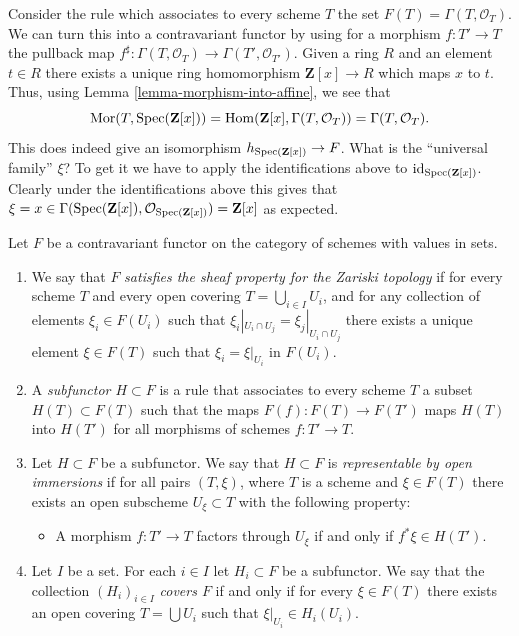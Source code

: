 \begin{example}
\label{example-global-sections}
Consider the rule which associates to every scheme $T$ the set
$F(T) = \Gamma(T, \mathcal{O}_T)$. We can turn this into a contravariant
functor by using for a morphism $f : T' \to T$ the pullback map
$f^\sharp : \Gamma(T, \mathcal{O}_T) \to \Gamma(T', \mathcal{O}_{T'})$.
Given a ring $R$ and an element $t \in R$ there exists a unique
ring homomorphism $\mathbf{Z}[x] \to R$ which maps $x$ to $t$.
Thus, using Lemma \ref{lemma-morphism-into-affine}, we see that
$$
\mathop{\mathrm{Mor}}\nolimits(T, \mathop{\mathrm{Spec}}(\mathbf{Z}[x])) =
\mathop{\mathrm{Hom}}\nolimits(\mathbf{Z}[x], \Gamma(T, \mathcal{O}_T)) =
\Gamma(T, \mathcal{O}_T).
$$
This does indeed
give an isomorphism $h_{\mathop{\mathrm{Spec}}(\mathbf{Z}[x])} \to F$.
What is the ``universal family'' $\xi$? To get it we have to
apply the identifications above to $\text{id}_{\mathop{\mathrm{Spec}}(\mathbf{Z}[x])}$.
Clearly under the identifications above this gives
that
$\xi = x \in \Gamma(\mathop{\mathrm{Spec}}(\mathbf{Z}[x]),
\mathcal{O}_{\mathop{\mathrm{Spec}}(\mathbf{Z}[x])}) = \mathbf{Z}[x]$
as expected.
\end{example}

\begin{definition}
\label{definition-representable-by-open-immersions}
Let $F$ be a contravariant functor on the category
of schemes with values in sets.
\begin{enumerate}
\item We say that $F$ {\it satisfies the sheaf property for the
Zariski topology} if for every scheme $T$ and every open covering
$T = \bigcup_{i \in I} U_i$, and for any collection of elements
$\xi_i \in F(U_i)$ such that $\xi_i|_{U_i \cap U_j} =
\xi_j|_{U_i \cap U_j}$ there exists a unique element
$\xi \in F(T)$ such that $\xi_i = \xi|_{U_i}$ in $F(U_i)$.
\item A {\it subfunctor $H \subset F$} is a rule that associates
to every scheme $T$ a subset $H(T) \subset F(T)$ such that
the maps $F(f) : F(T) \to F(T')$ maps $H(T)$ into
$H(T')$ for all morphisms of schemes $f : T' \to T$.
\item Let $H \subset F$ be a subfunctor. We say that
$H \subset F$ is {\it representable by open immersions}
if for all pairs $(T, \xi)$, where $T$ is a scheme and $\xi \in F(T)$
there exists an open subscheme $U_\xi \subset T$ with the following
property:
\begin{itemize}
\item[(*)] A morphism $f : T' \to T$ factors through $U_\xi$ if and only
if $f^*\xi \in H(T')$.
\end{itemize}
\item Let $I$ be a set. For each $i \in I$ let $H_i \subset F$
be a subfunctor. We say that the collection $(H_i)_{i \in I}$
{\it covers $F$} if and only if for every $\xi \in F(T)$
there exists an open covering $T = \bigcup U_i$ such that
$\xi|_{U_i} \in H_i(U_i)$.
\end{enumerate}
\end{definition}

